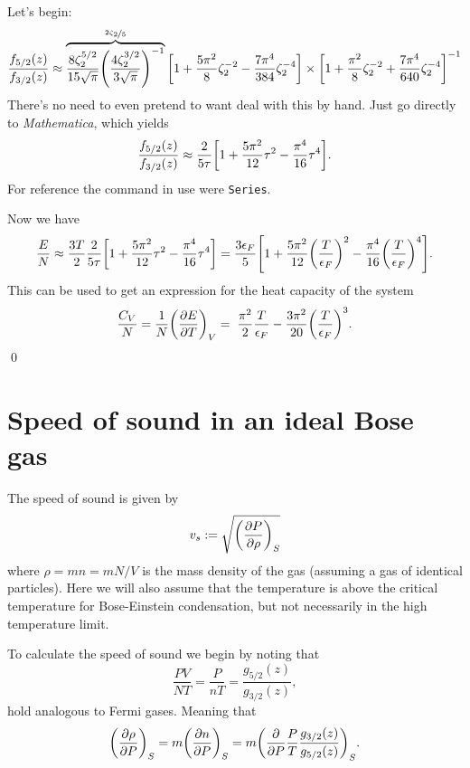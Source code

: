 \documentclass[11pt,letter, swedish, english
]{article}
\renewcommand{\thesubsection}{\arabic{section} (\alph{subsection})}
\begin{document}
Let's begin:
\begin{equation}
\frac{f_{5/2}(z)}{f_{3/2}(z)}\approx
\overbrace{\frac{8\zeta_2^{5/2}}{15\sqrt{\pi}}
\qty(\frac{4\zeta_2^{3/2}}{3\sqrt{\pi}})^{-1}}^{\nicefrac{2\zeta_2}{5}}
\qty[1+\frac{5\pi^2}{8}\zeta_2^{-2}
-\frac{7\pi^4}{384}\zeta_2^{-4} ]
\times \qty[1+\frac{\pi^2}{8}\zeta_2^{-2} 
+\frac{7\pi^4}{640}\zeta_2^{-4} ]^{-1}
\end{equation}
There's no need to even pretend to want deal with this by hand.
Just go directly to \emph{Mathematica}, which yields
\begin{equation}
\frac{f_{5/2}(z)}{f_{3/2}(z)}\approx \frac{2}{5\tau}
\qty[1+\frac{5\pi^2}{12}\tau^2-\frac{\pi^4}{16}\tau^4].
\end{equation}
For reference the command in use were \texttt{Series}.

Now we have
\begin{equation}
\frac{E}{N}\approx\frac{3T}{2}\frac{2}{5\tau}
\qty[1+\frac{5\pi^2}{12}\tau^2-\frac{\pi^4}{16}\tau^4]
=\frac{3\epsilon_F}{5}\qty[1
+\frac{5\pi^2}{12}\qty(\frac{T}{\epsilon_F})^2
-\frac{\pi^4}{16}\qty(\frac{T}{\epsilon_F})^4].
\end{equation}
This can be used to get an expression for the heat capacity of the
system
\begin{equation}\label{eq:CV_Fermi}
\frac{C_V}{N}=\frac{1}{N}\qty(\pdv{E}{T})_V
=\;\frac{\pi^2}{2}\frac{T}{\epsilon_F}
 - \frac{3\pi^2}{20}\qty(\frac{T}{\epsilon_F})^3.
\end{equation}
\qed


\renewcommand{\thesubsection}{\arabic{section} (\alph{subsection})}
\section{Speed of sound in an ideal Bose gas}
The speed of sound is given by
\begin{equation}
v_s:=\sqrt{\qty(\pdv{P}{\rho})_S}
\end{equation}
where $\rho=mn=mN/V$ is the mass density of the gas (assuming a gas of
identical particles). Here we will also assume that the temperature is
above the critical temperature for Bose-Einstein condensation, but not
necessarily in the high temperature limit.

To calculate the speed of sound we begin by noting that 
\begin{equation}\label{eq:3_PVNT}
\frac{PV}{NT}=\frac{P}{nT}=\frac{g_{5/2}(z)}{g_{3/2}(z)},
\end{equation}
hold analogous to Fermi gases. Meaning that
\begin{equation}\label{eq:3_dn/dP}
\qty(\pdv{\rho}{P})_S=m\qty(\pdv{n}{P})_S
=m\qty(\pdv{P} \frac{P}{T}\frac{g_{3/2}(z)}{g_{5/2}(z)})_S.
\end{equation}
\end{document}
